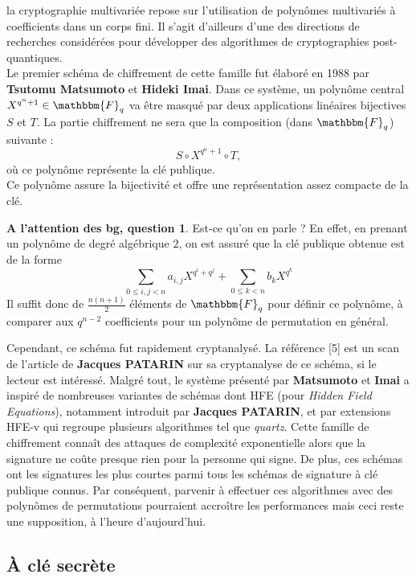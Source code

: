 \documentclass[12pt]{article}
\theoremstyle{remark}\newtheorem{note}{Note}
\theoremstyle{remark}\newtheorem{nota}{Notation}
\newcommand{\Fq}{\mathbbm{F}_q}
\theoremstyle{definition}
\newtheorem{bg}{A l'attention des bg, question}
\begin{document}
la cryptographie multivariée repose sur l'utilisation de polynômes multivariés à coefficients dans un corps fini. Il s'agit d'ailleurs d'une des directions de recherches considérées pour développer des algorithmes de cryptographies post-quantiques.\\
Le premier schéma de chiffrement de cette famille fut élaboré en 1988 par \textbf{Tsutomu Matsumoto} et \textbf{Hideki Imai}. Dans ce système, un polynôme central $X^{q^n+1} \in \Fq$ va être masqué par deux applications linéaires bijectives $S$ et $T$. La partie chiffrement ne sera que la composition (dans $\Fq$) suivante : $$S\circ X^{q^n+1} \circ T,$$
où ce polynôme représente la clé publique.\\
Ce polynôme assure la bijectivité et offre une représentation assez compacte de la clé. 
\begin{bg}{Est-ce qu'on en parle ?}
En effet, en prenant un polynôme de degré algébrique $2$, on est assuré que la clé publique obtenue est de la forme 
$$\displaystyle\sum_{0\leq i,j<n} a_{i,j}X^{q^i+q^j} + \displaystyle\sum_{0\leq k<n} b_{k}X^{q^k}$$
Il suffit donc de $\frac{n(n+1)}{2}$ éléments de $\Fq$ pour définir ce polynôme, à comparer aux $q^{n-2}$ coefficients pour un polynôme de permutation en général.
\end{bg}
Cependant, ce schéma fut rapidement cryptanalysé. La référence [5] est un scan de l'article de \textbf{Jacques PATARIN} sur sa cryptanalyse de ce schéma, si le lecteur est intéressé. Malgré tout, le système présenté par \textbf{Matsumoto} et \textbf{Imai} a inspiré de nombreuses variantes de schémas dont \textsf{HFE} (pour \textit{Hidden Field Equations}), notamment introduit par \textbf{Jacques PATARIN}, et par extensions %
\textsf{HFE-v} qui regroupe plusieurs algorithmes tel que \textit{quartz}. Cette famille de chiffrement connaît des attaques de complexité exponentielle alors que la signature ne coûte presque rien pour la personne qui signe. De plus, ces schémas ont les signatures les plus courtes parmi tous les schémas de signature à clé publique connus. Par conséquent, parvenir à effectuer ces algorithmes avec des polynômes de permutations pourraient accroître les performances mais ceci reste une supposition, à l'heure d'aujourd'hui.\\


\subsection{À clé secrète}
\end{document}
